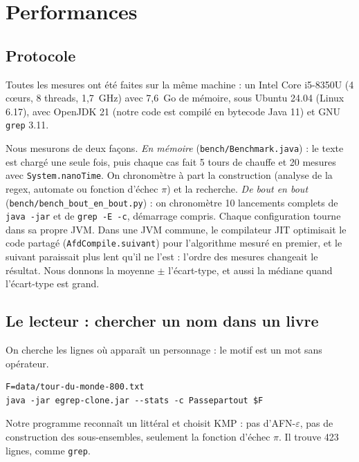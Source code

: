 
\section{Performances}
\label{sec:performances}

\subsection{Protocole}

Toutes les mesures ont été faites sur la même machine : un Intel Core
i5-8350U (4 cœurs, 8 threads, 1,7~GHz) avec 7,6~Go de mémoire, sous
Ubuntu 24.04 (Linux 6.17), avec OpenJDK 21 (notre code est compilé en
bytecode Java 11) et GNU \texttt{grep} 3.11.

Nous mesurons de deux façons. \emph{En mémoire} (\texttt{bench/Benchmark.java}) :
le texte est chargé une seule fois, puis chaque cas fait 5 tours de
chauffe et 20 mesures avec \texttt{System.nanoTime}. On chronomètre à part
la construction (analyse de la regex, automate ou fonction d'échec $\pi$)
et la recherche. \emph{De bout en bout} (\texttt{bench/bench\_bout\_en\_bout.py}) :
on chronomètre 10 lancements complets de \texttt{java -jar} et de
\texttt{grep -E -c}, démarrage compris. Chaque configuration tourne dans
sa propre JVM. Dans une JVM commune, le compilateur JIT optimisait le
code partagé (\texttt{AfdCompile.suivant}) pour l'algorithme mesuré en
premier, et le suivant paraissait plus lent qu'il ne l'est : l'ordre des
mesures changeait le résultat. Nous donnons la moyenne $\pm$ l'écart-type,
et aussi la médiane quand l'écart-type est grand.

\subsection{Le lecteur : chercher un nom dans un livre}

On cherche les lignes où apparaît un personnage : le motif est un mot
sans opérateur.
\begin{verbatim}
F=data/tour-du-monde-800.txt
java -jar egrep-clone.jar --stats -c Passepartout $F
\end{verbatim}
Notre programme reconnaît un littéral et choisit KMP : pas d'AFN-$\varepsilon$,
pas de construction des sous-ensembles, seulement la fonction d'échec
$\pi$. Il trouve 423 lignes, comme \texttt{grep}.

